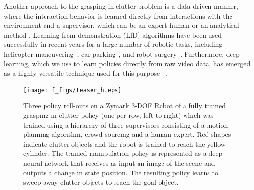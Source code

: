 \documentclass[10pt, conference]{ieeeconf}      %
\begin{document}
Another approach to the grasping in
clutter problem is a data-driven manner, where the interaction behavior is learned directly from interactions with the environment and a supervisor, which can be an expert human or an analytical method \cite{argall2009survey}. Learning from demonstration (LfD) algorithms have been used
successfully in recent years for a large number of robotic tasks, including helicopter
maneuvering~\cite{abbeel2007application}, car parking~\cite{abbeel2008apprenticeship},  and robot
surgery~\cite{van2010superhuman}. Furthermore, deep learning, which we use to learn policies directly from raw video
data, has emerged as a highly versatile technique used for this purpose ~\cite{pinto2015supersizing}.

\begin{figure}
\texttt{[image: f\_figs/teaser\_h.eps]}
\caption{
    \footnotesize
Three policy roll-outs on a Zymark 3-DOF Robot of a fully trained grasping in clutter policy (one per row, left to
right) which was trained using a hierarchy of three supervisors consisting of a motion planning algorithm, crowd-sourcing and a human expert. 
Red shapes indicate clutter objects and the robot is trained to reach the yellow cylinder. The trained manipulation
policy is represented as a deep neural network that receives as input an image of the scene and outputs a change in
state position. The resulting policy learns to sweep away clutter objects to reach the goal object. }
\vspace*{-20pt}
\label{fig:teaser}
\end{figure}

\end{document}
